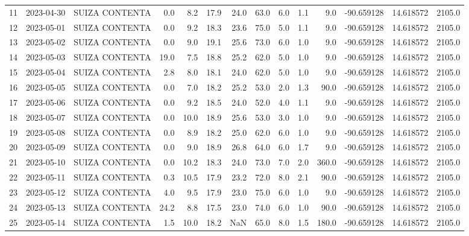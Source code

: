 \documentclass[12pt]{article}
\begin{document}
\begin{center}
\begin{tabular}{lllrrrrrrrrrrr}
11  & 2023-04-30 &  SUIZA CONTENTA &     0.0 &   8.2 &   17.9 &  24.0 &     63.0 &  6.0 &         1.1 &         9.0 & -90.659128 &  14.618572 &   2105.0 \\
12  & 2023-05-01 &  SUIZA CONTENTA &     0.0 &   9.2 &   18.3 &  23.6 &     75.0 &  5.0 &         1.1 &         9.0 & -90.659128 &  14.618572 &   2105.0 \\
13  & 2023-05-02 &  SUIZA CONTENTA &     0.0 &   9.0 &   19.1 &  25.6 &     73.0 &  6.0 &         1.0 &         9.0 & -90.659128 &  14.618572 &   2105.0 \\
14  & 2023-05-03 &  SUIZA CONTENTA &    19.0 &   7.5 &   18.8 &  25.2 &     62.0 &  5.0 &         1.0 &         9.0 & -90.659128 &  14.618572 &   2105.0 \\
15  & 2023-05-04 &  SUIZA CONTENTA &     2.8 &   8.0 &   18.1 &  24.0 &     62.0 &  5.0 &         1.0 &         9.0 & -90.659128 &  14.618572 &   2105.0 \\
16  & 2023-05-05 &  SUIZA CONTENTA &     0.0 &   7.0 &   18.2 &  25.2 &     53.0 &  2.0 &         1.3 &        90.0 & -90.659128 &  14.618572 &   2105.0 \\
17  & 2023-05-06 &  SUIZA CONTENTA &     0.0 &   9.2 &   18.5 &  24.0 &     52.0 &  4.0 &         1.1 &         9.0 & -90.659128 &  14.618572 &   2105.0 \\
18  & 2023-05-07 &  SUIZA CONTENTA &     0.0 &  10.0 &   18.9 &  25.6 &     53.0 &  3.0 &         1.0 &         9.0 & -90.659128 &  14.618572 &   2105.0 \\
19  & 2023-05-08 &  SUIZA CONTENTA &     0.0 &   8.9 &   18.2 &  25.0 &     62.0 &  6.0 &         1.0 &         9.0 & -90.659128 &  14.618572 &   2105.0 \\
20  & 2023-05-09 &  SUIZA CONTENTA &     0.0 &   9.0 &   18.9 &  26.8 &     64.0 &  6.0 &         1.7 &         9.0 & -90.659128 &  14.618572 &   2105.0 \\
21  & 2023-05-10 &  SUIZA CONTENTA &     0.0 &  10.2 &   18.3 &  24.0 &     73.0 &  7.0 &         2.0 &       360.0 & -90.659128 &  14.618572 &   2105.0 \\
22  & 2023-05-11 &  SUIZA CONTENTA &     0.3 &  10.5 &   17.9 &  23.2 &     72.0 &  8.0 &         2.1 &        90.0 & -90.659128 &  14.618572 &   2105.0 \\
23  & 2023-05-12 &  SUIZA CONTENTA &     4.0 &   9.5 &   17.9 &  23.0 &     75.0 &  6.0 &         1.0 &         9.0 & -90.659128 &  14.618572 &   2105.0 \\
24  & 2023-05-13 &  SUIZA CONTENTA &    24.2 &   8.8 &   17.5 &  23.0 &     74.0 &  6.0 &         1.0 &        90.0 & -90.659128 &  14.618572 &   2105.0 \\
25  & 2023-05-14 &  SUIZA CONTENTA &     1.5 &  10.0 &   18.2 &   NaN &     65.0 &  8.0 &         1.5 &       180.0 & -90.659128 &  14.618572 &   2105.0 \\
\bottomrule
\end{tabular}

        
        \end{center}
        
\end{document}
